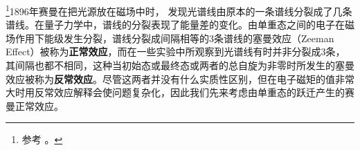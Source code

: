 

\footnote{参考 \cite{GriffQ}。}1896年赛曼在把光源放在磁场中时， 发现光谱线由原本的一条谱线分裂成了几条谱线。在量子力学中，谱线的分裂表现了能量差的变化。由单重态之间的电子在磁场作用下能级发生分裂，谱线分裂成间隔相等的3条谱线的塞曼效应（Zeeman Effect）被称为\textbf{正常效应}，而在一些实验中所观察到光谱线有时并非分裂成3条，其间隔也都不相同，这种当初始态或最终态或两者的总自旋为非零时所发生的塞曼效应被称为\textbf{反常效应}。尽管这两者并没有什么实质性区别，但在电子磁矩的值非常大时用反常效应解释会使问题复杂化，因此我们先来考虑由单重态的跃迁产生的赛曼正常效应。

